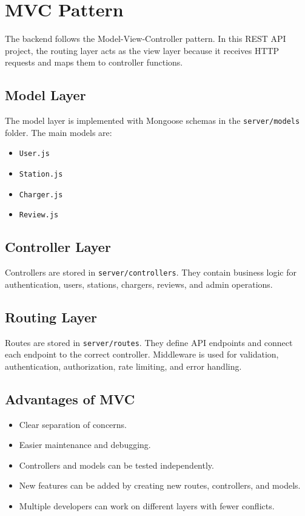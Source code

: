 \documentclass[12pt,a4paper]{article}
\begin{document}
\section{MVC Pattern}

The backend follows the Model-View-Controller pattern. In this REST API project, the routing layer acts as the view layer because it receives HTTP requests and maps them to controller functions.

\subsection{Model Layer}

The model layer is implemented with Mongoose schemas in the \texttt{server/models} folder. The main models are:

\begin{itemize}
  \item \texttt{User.js}
  \item \texttt{Station.js}
  \item \texttt{Charger.js}
  \item \texttt{Review.js}
\end{itemize}

\subsection{Controller Layer}

Controllers are stored in \texttt{server/controllers}. They contain business logic for authentication, users, stations, chargers, reviews, and admin operations.

\subsection{Routing Layer}

Routes are stored in \texttt{server/routes}. They define API endpoints and connect each endpoint to the correct controller. Middleware is used for validation, authentication, authorization, rate limiting, and error handling.

\subsection{Advantages of MVC}

\begin{itemize}
  \item Clear separation of concerns.
  \item Easier maintenance and debugging.
  \item Controllers and models can be tested independently.
  \item New features can be added by creating new routes, controllers, and models.
  \item Multiple developers can work on different layers with fewer conflicts.
\end{itemize}
\end{document}
